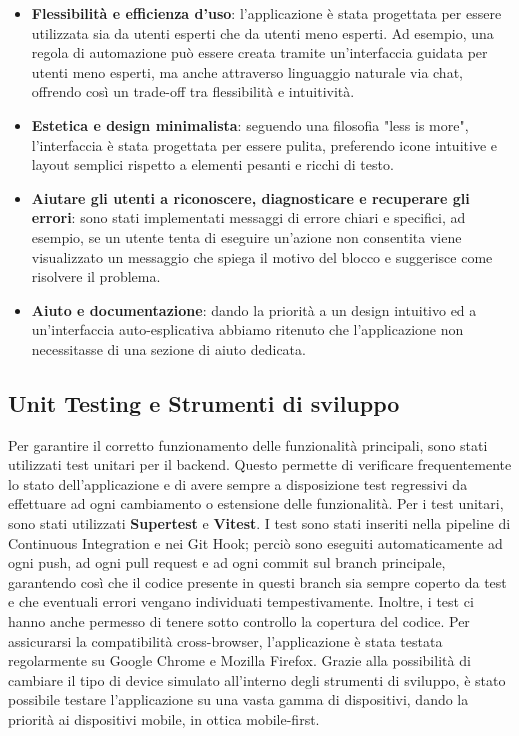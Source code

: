 \documentclass[a4paper,12pt]{article}
\begin{document}
\begin{itemize}
    \item \textbf{Flessibilità e efficienza d'uso}: l'applicazione è stata progettata per essere utilizzata sia da utenti esperti che da utenti meno esperti. Ad esempio, una regola di automazione può essere creata tramite un'interfaccia guidata per utenti meno esperti, ma anche attraverso linguaggio naturale via chat, offrendo così un trade-off tra flessibilità e intuitività.
    \item \textbf{Estetica e design minimalista}: seguendo una filosofia "less is more", l'interfaccia è stata progettata per essere pulita, preferendo icone intuitive e layout semplici rispetto a elementi pesanti e ricchi di testo.
    \item \textbf{Aiutare gli utenti a riconoscere, diagnosticare e recuperare gli errori}: sono stati implementati messaggi di errore chiari e specifici, ad esempio, se un utente tenta di eseguire un'azione non consentita viene visualizzato un messaggio che spiega il motivo del blocco e suggerisce come risolvere il problema.
    \item \textbf{Aiuto e documentazione}: dando la priorità a un design intuitivo ed a un'interfaccia auto-esplicativa abbiamo ritenuto che l'applicazione non necessitasse di una sezione di aiuto dedicata.
\end{itemize}
\subsection{Unit Testing e Strumenti di sviluppo}
Per garantire il corretto funzionamento delle funzionalità principali, sono stati utilizzati test unitari per il backend. Questo permette di verificare frequentemente lo stato dell'applicazione e di avere sempre a disposizione test regressivi da effettuare ad ogni cambiamento o estensione delle funzionalità. Per i test unitari, sono stati utilizzati \textbf{Supertest} e \textbf{Vitest}. I test sono stati inseriti nella pipeline di Continuous Integration e nei Git Hook; perciò sono eseguiti automaticamente ad ogni push, ad ogni pull request e ad ogni commit sul branch principale, garantendo così che il codice presente in questi branch sia sempre coperto da test e che eventuali errori vengano individuati tempestivamente. Inoltre, i test ci hanno anche permesso di tenere sotto controllo la copertura del codice.
Per assicurarsi la compatibilità cross-browser, l'applicazione è stata testata regolarmente su Google Chrome e Mozilla Firefox. Grazie alla possibilità di cambiare il tipo di device simulato all'interno degli strumenti di sviluppo, è stato possibile testare l'applicazione su una vasta gamma di dispositivi, dando la priorità ai dispositivi mobile, in ottica mobile-first.
\end{document}
